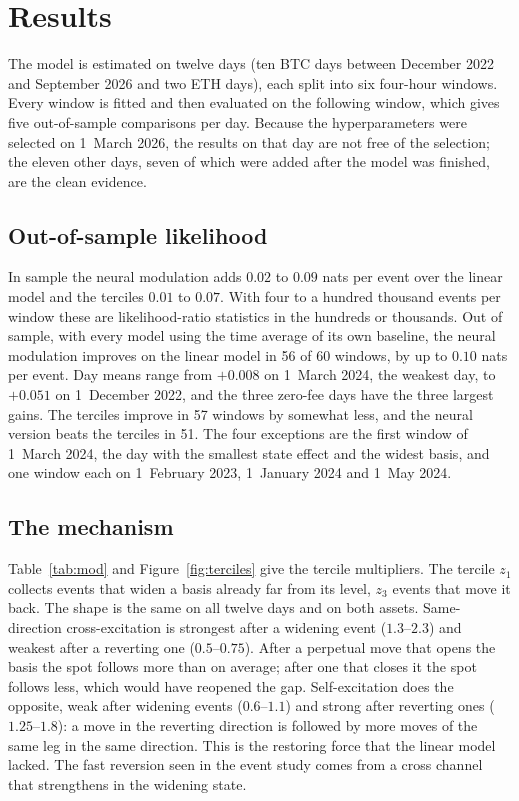 \documentclass[a4paper,11pt]{article}
\begin{document}
\section{Results}

The model is estimated on twelve days (ten BTC days between December 2022 and September 2026 and two ETH days), each split into six four-hour windows. Every window is fitted and then evaluated on the following window, which gives five out-of-sample comparisons per day. Because the hyperparameters were selected on 1~March 2026, the results on that day are not free of the selection; the eleven other days, seven of which were added after the model was finished, are the clean evidence.

\subsection{Out-of-sample likelihood}

In sample the neural modulation adds $0.02$ to $0.09$ nats per event over the linear model and the terciles $0.01$ to $0.07$. With four to a hundred thousand events per window these are likelihood-ratio statistics in the hundreds or thousands. Out of sample, with every model using the time average of its own baseline, the neural modulation improves on the linear model in 56 of 60 windows, by up to $0.10$ nats per event. Day means range from $+0.008$ on 1~March 2024, the weakest day, to $+0.051$ on 1~December 2022, and the three zero-fee days have the three largest gains. The terciles improve in 57 windows by somewhat less, and the neural version beats the terciles in 51. The four exceptions are the first window of 1~March 2024, the day with the smallest state effect and the widest basis, and one window each on 1~February 2023, 1~January 2024 and 1~May 2024.

\subsection{The mechanism}\label{sec:mechanism}

Table~\ref{tab:mod} and Figure~\ref{fig:terciles} give the tercile multipliers. The tercile $z_1$ collects events that widen a basis already far from its level, $z_3$ events that move it back. The shape is the same on all twelve days and on both assets. Same-direction cross-excitation is strongest after a widening event ($1.3$--$2.3$) and weakest after a reverting one ($0.5$--$0.75$). After a perpetual move that opens the basis the spot follows more than on average; after one that closes it the spot follows less, which would have reopened the gap. Self-excitation does the opposite, weak after widening events ($0.6$--$1.1$) and strong after reverting ones ($1.25$--$1.8$): a move in the reverting direction is followed by more moves of the same leg in the same direction. This is the restoring force that the linear model lacked. The fast reversion seen in the event study comes from a cross channel that strengthens in the widening state.
\end{document}
